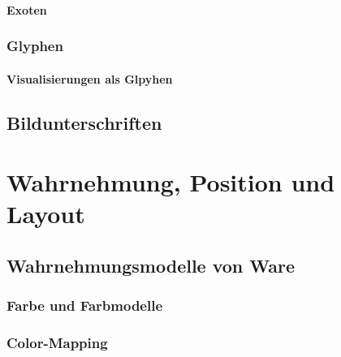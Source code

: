                 \paragraph{Exoten} %

            \subsubsection{Glyphen} %

                \paragraph{Visualisierungen als Glpyhen} %

        \subsection{Bildunterschriften} %

    \section{Wahrnehmung, Position und Layout} %

        \subsection{Wahrnehmungsmodelle von Ware} %

            \subsubsection{Farbe und Farbmodelle} %

            \subsubsection{Color-Mapping} %

